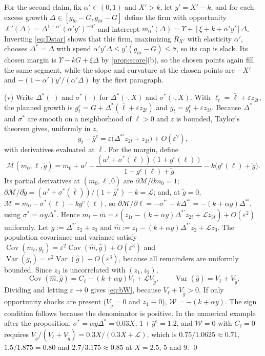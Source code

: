 For the second claim, fix $\alpha'\in(0,1)$ and $X'>k$, let $y'=X'-k$, and for each excess growth $\Delta\in[g_{lo}-G,g_{hi}-G]$ define the firm with opportunity $\ell'(\Delta)=\Delta^{1-\alpha'}(\alpha'y')^{-\alpha'}$ and intercept $m_0'(\Delta)=\Upsilon+[\xi+k+\alpha'y']\Delta$. Inverting \eqref{eq:Dstar} shows that this firm, maximizing $R_{X'}$ with elasticity $\alpha'$, chooses $\Delta^*=\Delta$ with spend $\alpha'y'\Delta\le y'(g_{hi}-G)\le\bar\sigma$, so its cap is slack. Its chosen margin is $\Upsilon-kG+\xi\Delta$ by \autoref{prop:score}(b), so the chosen points again fill the same segment, while the slope and curvature at the chosen points are $-X'$ and $-(1-\alpha')y'/(\alpha'\Delta)$ by the first paragraph.

(v) Write $\Delta^*(\cdot)$ and $\sigma^*(\cdot)$ for $\Delta^*(\cdot,X)$ and $\sigma^*(\cdot,X)$. With $\ell_t=\bar\ell+\varepsilon z_{2t}$, the planned growth is $g_t^e=G+\Delta^*(\bar\ell+\varepsilon z_{2t})$ and $g_t=g_t^e+\varepsilon z_{3t}$. Because $\Delta^*$ and $\sigma^*$ are smooth on a neighborhood of $\bar\ell>0$ and $z$ is bounded, Taylor's theorem gives, uniformly in $z$,
\[
g_t-\bar g^e=\varepsilon\bigl(\Delta^{*\prime}z_{2t}+z_{3t}\bigr)+O(\varepsilon^2),
\]
with derivatives evaluated at $\bar\ell$. For the margin, define
\[
\mathcal M(m_0,\ell,\tilde g)=m_0+a^f-\frac{(a^f+\sigma^*(\ell))(1+g^e(\ell))}{1+g^e(\ell)+\tilde g}-k\bigl(g^e(\ell)+\tilde g\bigr).
\]
 Its partial derivatives at $(\bar m_0,\bar\ell,0)$ are $\partial\mathcal M/\partial m_0=1$; $\partial\mathcal M/\partial\tilde g=(a^f+\sigma^*(\bar\ell))/(1+\bar g^e)-k=\mathcal L$; and, at $\tilde g=0$, $\mathcal M=m_0-\sigma^*(\ell)-kg^e(\ell)$, so $\partial\mathcal M/\partial\ell=-\sigma^{*\prime}-k\Delta^{*\prime}=-(k+\alpha y)\Delta^{*\prime}$, using $\sigma^*=\alpha y\Delta^*$. Hence $m_t-\bar m=\varepsilon(z_{1t}-(k+\alpha y)\Delta^{*\prime}z_{2t}+\mathcal Lz_{3t})+O(\varepsilon^2)$ uniformly. Let $\hat g:=\Delta^{*\prime}z_2+z_3$ and $\hat m:=z_1-(k+\alpha y)\Delta^{*\prime}z_2+\mathcal Lz_3$. The population covariance and variance satisfy $\operatorname{Cov}(m_t,g_t)=\varepsilon^2\operatorname{Cov}(\hat m,\hat g)+O(\varepsilon^3)$ and $\operatorname{Var}(g_t)=\varepsilon^2\operatorname{Var}(\hat g)+O(\varepsilon^3)$, because all remainders are uniformly bounded. Since $z_3$ is uncorrelated with $(z_1,z_2)$,
\[
\operatorname{Cov}(\hat m,\hat g)=C_\ell-(k+\alpha y)V_\ell+\mathcal LV_{\tilde g},\qquad \operatorname{Var}(\hat g)=V_\ell+V_{\tilde g}.
\]
Dividing and letting $\varepsilon\to 0$ gives \eqref{eq:bW}, because $V_\ell+V_{\tilde g}>0$. If only opportunity shocks are present ($V_{\tilde g}=0$ and $z_1\equiv 0$), $\mathcal W=-(k+\alpha y)$. The sign condition follows because the denominator is positive. In the numerical example after the proposition, $\sigma^*=\alpha y\Delta^*=0.03X$, $1+\bar g^e=1.2$, and $\mathcal W=0$ with $C_\ell=0$ requires $V_{\tilde g}/(V_\ell+V_{\tilde g})=0.3X/(0.3X+\mathcal L)$, which is $0.75/1.0625\approx0.71$, $1.5/1.875=0.80$ and $2.7/3.175\approx0.85$ at $X=2.5$, 5 and 9. \qed

